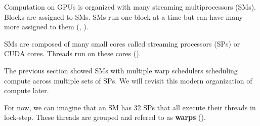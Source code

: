 Computation on GPUs is organized with many streaming multiprocessors (SMs).
Blocks are assigned to SMs. SMs run one block at a time but can have
many more assigned to them (\cite{aamodt2018general}, \cite{nvidiaCUDAProgramming}).

SMs are composed of many small cores called streaming processors (SPs) or CUDA cores.
Threads run on these cores (\cite{nvidiaCUDAProgramming}).

The previous section showed SMs with multiple
warp schedulers scheduling compute across multiple sets of SPs.
We will revisit this modern organization of compute later.

For now, we can imagine that an SM has 32 SPs that all execute their threads in
lock-step. These threads are grouped and refered to as \textbf{warps} (\cite{aamodt2018general}).

